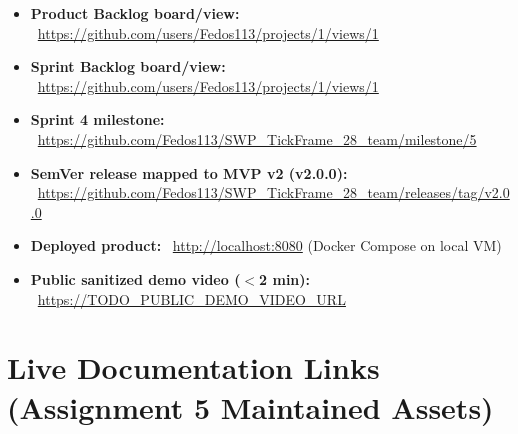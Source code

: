 \documentclass[11pt,a4paper]{article}
\begin{document}
\begin{itemize}[leftmargin=*]
    \item \textbf{Product Backlog board/view:} \
          \url{https://github.com/users/Fedos113/projects/1/views/1}

    \item \textbf{Sprint Backlog board/view:} \
          \url{https://github.com/users/Fedos113/projects/1/views/1}

    \item \textbf{Sprint 4 milestone:} \
          \url{https://github.com/Fedos113/SWP_TickFrame_28_team/milestone/5}

    \item \textbf{SemVer release mapped to MVP v2 (v2.0.0):} \
          \url{https://github.com/Fedos113/SWP_TickFrame_28_team/releases/tag/v2.0.0}

    \item \textbf{Deployed product:} \
          \url{http://localhost:8080} (Docker Compose on local VM)

    \item \textbf{Public sanitized demo video ($<$2 min):} \
          \url{https://TODO_PUBLIC_DEMO_VIDEO_URL} %
\end{itemize}

\section{Live Documentation Links (Assignment 5 Maintained Assets)}
\end{document}
